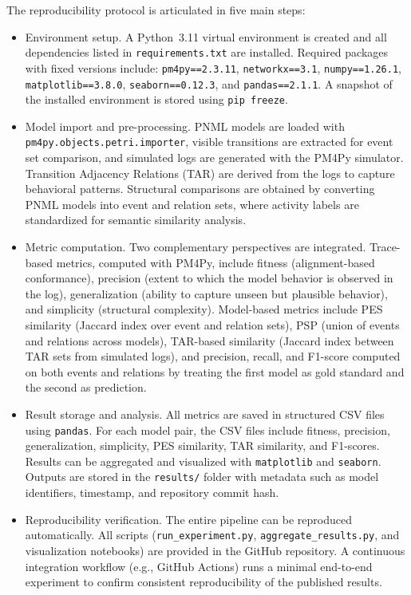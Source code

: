 The reproducibility protocol is articulated in five main steps:

\begin{itemize}
    \item Environment setup. A Python~3.11 virtual environment is created and all dependencies listed in \texttt{requirements.txt} are installed. Required packages with fixed versions include:
    \texttt{pm4py==2.3.11}, \texttt{networkx==3.1}, \texttt{numpy==1.26.1}, \texttt{matplotlib==3.8.0}, \texttt{seaborn==0.12.3}, and \texttt{pandas==2.1.1}. A snapshot of the installed environment is stored using \texttt{pip freeze}.
    
    \item Model import and pre-processing. PNML models are loaded with \texttt{pm4py.objects.petri.importer}, visible transitions are extracted for event set comparison, and simulated logs are generated with the PM4Py simulator. Transition Adjacency Relations (TAR) are derived from the logs to capture behavioral patterns. Structural comparisons are obtained by converting PNML models into event and relation sets, where activity labels are standardized for semantic similarity analysis.
    
    \item Metric computation. Two complementary perspectives are integrated. Trace-based metrics, computed with PM4Py, include fitness (alignment-based conformance), precision (extent to which the model behavior is observed in the log), generalization (ability to capture unseen but plausible behavior), and simplicity (structural complexity). Model-based metrics include PES similarity (Jaccard index over event and relation sets), PSP (union of events and relations across models), TAR-based similarity (Jaccard index between TAR sets from simulated logs), and precision, recall, and F1-score computed on both events and relations by treating the first model as gold standard and the second as prediction.
    
    \item Result storage and analysis. All metrics are saved in structured CSV files using \texttt{pandas}. For each model pair, the CSV files include fitness, precision, generalization, simplicity, PES similarity, TAR similarity, and F1-scores. Results can be aggregated and visualized with \texttt{matplotlib} and \texttt{seaborn}. Outputs are stored in the \texttt{results/} folder with metadata such as model identifiers, timestamp, and repository commit hash.
    
    \item Reproducibility verification. The entire pipeline can be reproduced automatically. All scripts (\texttt{run\_experiment.py}, \texttt{aggregate\_results.py}, and visualization notebooks) are provided in the GitHub repository. A continuous integration workflow (e.g., GitHub Actions) runs a minimal end-to-end experiment to confirm consistent reproducibility of the published results.
\end{itemize}
